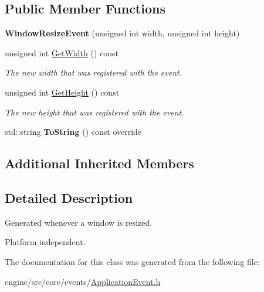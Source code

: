 \subsection*{Public Member Functions}
\begin{DoxyCompactItemize}
\item 
\mbox{\label{classengine_1_1events_1_1WindowResizeEvent_ab3b3376d2bc9f18505798fc73ef35313}} 
{\bfseries Window\+Resize\+Event} (unsigned int width, unsigned int height)
\item 
\mbox{\label{classengine_1_1events_1_1WindowResizeEvent_a0858a751bbb0a18846c7377dbbe3d977}} 
unsigned int \hyperlink{classengine_1_1events_1_1WindowResizeEvent_a0858a751bbb0a18846c7377dbbe3d977}{Get\+Width} () const
\begin{DoxyCompactList}\small\item\em The new width that was registered with the event. \end{DoxyCompactList}\item 
\mbox{\label{classengine_1_1events_1_1WindowResizeEvent_af918787c7055557358d6babefdd208b2}} 
unsigned int \hyperlink{classengine_1_1events_1_1WindowResizeEvent_af918787c7055557358d6babefdd208b2}{Get\+Height} () const
\begin{DoxyCompactList}\small\item\em The new height that was registered with the event. \end{DoxyCompactList}\item 
\mbox{\label{classengine_1_1events_1_1WindowResizeEvent_a7b51e15132e30f7e45cd045031a56afb}} 
std\+::string {\bfseries To\+String} () const override
\end{DoxyCompactItemize}
\subsection*{Additional Inherited Members}


\subsection{Detailed Description}
Generated whenever a window is resized. 

Platform independent. 

The documentation for this class was generated from the following file\+:\begin{DoxyCompactItemize}
\item 
engine/src/core/events/\hyperlink{ApplicationEvent_8h}{Application\+Event.\+h}\end{DoxyCompactItemize}
